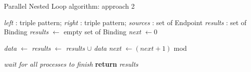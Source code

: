\begin{algorithm}[ht]
    \caption{Parallel Nested Loop algorithm: approach 2}\label{algo:pnl}
    \begin{algorithmic}[1]
        \Require \textit{left} : triple pattern; \textit{right} : triple pattern; \textit{sources} : set of Endpoint
        \Ensure \textit{results} : set of Binding
            \State \textit{results} $\gets$ empty set of Binding
            \State \textit{next} $\gets 0$

             
                \State \textit{data} $\gets$ 
                \State \textit{results} $\gets$ \textit{results} $\cup$ \textit{data}
                \State \textit{next} $\gets (\textit{next} + 1)$ mod 
            \EndFor

            \State \emph{wait for all processes to finish}
            \State \textbf{return} \textit{results}
        \EndFunction
    \end{algorithmic}
\end{algorithm}
